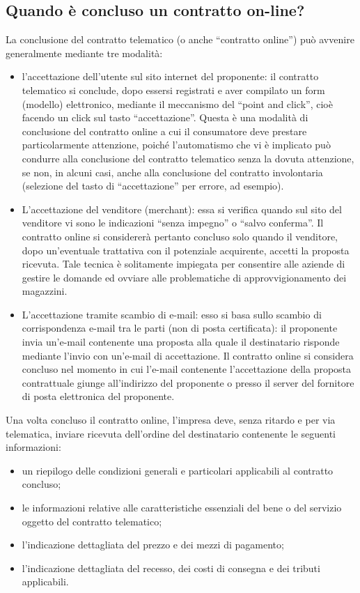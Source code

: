\subsection{Quando è concluso un contratto on-line?}
La conclusione del contratto telematico (o anche “contratto online”) può avvenire generalmente mediante tre modalità:
\begin{itemize}
    \item l'accettazione dell'utente sul sito internet del proponente: il contratto
        telematico si conclude, dopo essersi registrati e aver compilato un form (modello)
        elettronico, mediante il meccanismo del “point and click”, cioè facendo un click
        sul tasto “accettazione”. Questa è una modalità di conclusione del contratto
        online a cui il consumatore deve prestare particolarmente attenzione, poiché
        l'automatismo che vi è implicato può condurre alla conclusione del contratto
        telematico senza la dovuta attenzione, se non, in alcuni casi, anche alla
        conclusione del contratto involontaria (selezione del tasto di “accettazione” per
        errore, ad esempio).
    \item L'accettazione del venditore (merchant):  essa si verifica quando sul sito del
        venditore vi sono le indicazioni “senza impegno” o “salvo conferma”. Il contratto
        online si considererà pertanto concluso solo quando il venditore, dopo
        un'eventuale trattativa con il potenziale acquirente, accetti la proposta
        ricevuta. Tale tecnica è solitamente impiegata per consentire alle aziende di
        gestire le domande ed ovviare alle problematiche di approvvigionamento dei
        magazzini.
    \item L'accettazione tramite scambio di e-mail: esso si basa sullo scambio di
        corrispondenza e-mail tra le parti (non di posta certificata): il proponente invia
        un'e-mail contenente una proposta alla quale il destinatario risponde mediante
        l'invio con un'e-mail di accettazione. Il contratto online si considera concluso
        nel momento in cui l'e-mail contenente l'accettazione della proposta contrattuale
        giunge all'indirizzo del proponente o presso il server del fornitore di posta
        elettronica del proponente.
\end{itemize}
Una volta concluso il contratto online, l'impresa deve, senza ritardo e per via
telematica, inviare ricevuta dell'ordine del destinatario contenente le seguenti
informazioni:
\begin{itemize}
    \item un riepilogo delle condizioni generali e particolari applicabili al contratto concluso;
    \item le informazioni relative alle caratteristiche essenziali del bene o del servizio oggetto del contratto telematico;
    \item l'indicazione dettagliata del prezzo e dei mezzi di pagamento;
    \item l'indicazione dettagliata del recesso, dei costi di consegna e dei tributi applicabili.
\end{itemize}
